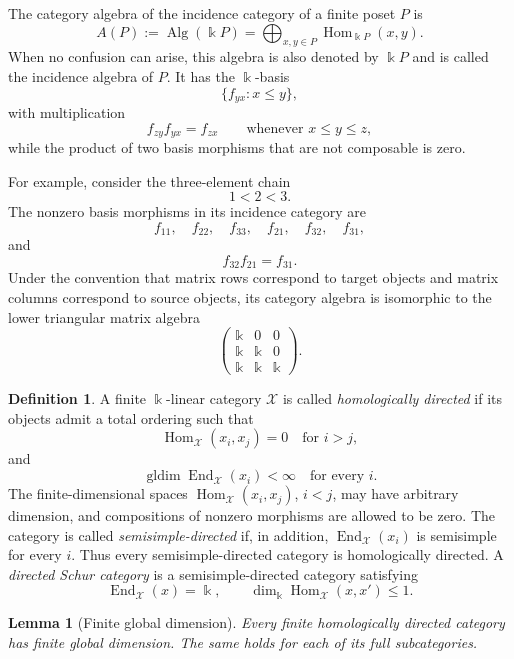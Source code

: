 \documentclass[12pt,a4paper,english,reqno]{amsart}
\theoremstyle{plain}
\newtheorem{lemma}[theorem]{Lemma}
\theoremstyle{definition}
\newtheorem{definition}[theorem]{Definition}
\newcommand{\kk}{\Bbbk}
\newcommand{\Hom}{\operatorname{Hom}}
\newcommand{\End}{\operatorname{End}}
\newcommand{\gldim}{\operatorname{gldim}}
\newcommand{\X}{\mathcal X}
\begin{document}
The category algebra of the incidence category of a finite poset $P$ is
\[
A(P)
:=
\operatorname{Alg}(\kk P)
=
\bigoplus_{x,y\in P}
\operatorname{Hom}_{\kk P}(x,y).
\]
When no confusion can arise, this algebra is also denoted by $\kk P$
and is called the incidence algebra of $P$. It has the $\kk$-basis
\[
\{f_{yx}:x\leq y\},
\]
with multiplication
\[
f_{zy}f_{yx}=f_{zx}
\qquad
\text{whenever }x\leq y\leq z,
\]
while the product of two basis morphisms that are not composable is zero.

For example, consider the three-element chain
\[
1<2<3.
\]
The nonzero basis morphisms in its incidence category are
\[
f_{11},\quad f_{22},\quad f_{33},\quad
f_{21},\quad f_{32},\quad f_{31},
\]
and
\[
f_{32}f_{21}=f_{31}.
\]
Under the convention that matrix rows correspond to target objects and
matrix columns correspond to source objects, its category algebra is
isomorphic to the lower triangular matrix algebra
\[
\begin{pmatrix}
\Bbbk & 0     & 0\\
\Bbbk & \Bbbk & 0\\
\Bbbk & \Bbbk & \Bbbk
\end{pmatrix}.
\]


\begin{definition}
A finite $\kk$-linear category $\X$ is called
\emph{homologically directed} if its objects admit a total ordering such that
\[
 \Hom_{\X}(x_i,x_j)=0\quad\text{for }i>j,
\]
and
\[
 \gldim\End_{\X}(x_i)<\infty\quad\text{for every }i.
\]
The finite-dimensional spaces
$\Hom_{\X}(x_i,x_j)$, $i<j$, may have arbitrary dimension, and
compositions of nonzero morphisms are allowed to be zero.  The category is
called \emph{semisimple-directed} if, in addition,
$\End_{\X}(x_i)$ is semisimple for every $i$.  Thus every
semisimple-directed category is homologically directed.  A
\emph{directed Schur category} is a semisimple-directed category satisfying
\[
 \End_{\X}(x)=\kk,
 \qquad
 \dim_{\kk}\Hom_{\X}(x,x')\leq1.
\]
\end{definition}

\begin{lemma}[Finite global dimension]
\label{lem:homologically-directed-global-dimension}
Every finite homologically directed category has finite global dimension.  The
same holds for each of its full subcategories.
\end{lemma}
\end{document}
